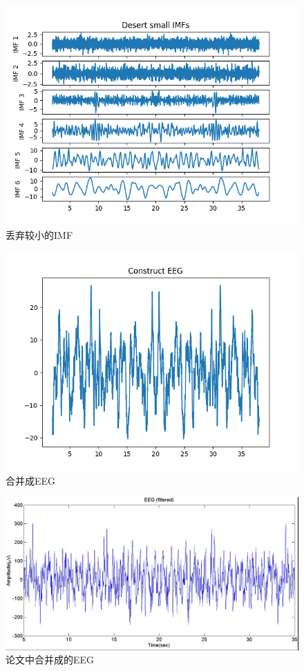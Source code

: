 \documentclass[cs4size,a4paper]{ctexart}
\numberwithin{equation}{section}
\numberwithin{table}{section}
\numberwithin{figure}{section}
\begin{document}
\begin{figure}[H]
\small
\centering
\includegraphics{desertSmallIMF.png}
\caption{丢弃较小的IMF} \label{fig:desertSmallIMF}
\end{figure}

\begin{figure}[H]
\small
\centering
\includegraphics{newEEG.png}
\caption{合并成EEG} \label{fig:newEEG}
\end{figure}

\begin{figure}[H]
\small
\centering
\includegraphics[width=\textwidth]{EEG-FromPaper.jpg}
\caption{论文中合并成的EEG} \label{fig:EEG-FromPaper}
\end{figure}
\end{document}
